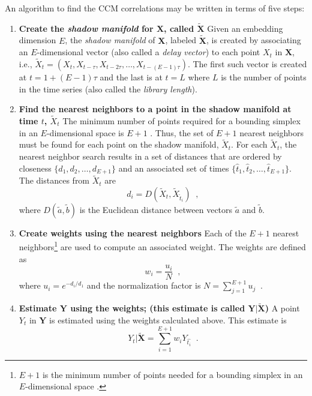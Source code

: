\documentclass{article}[10pt]
\begin{document}
An algorithm to find the CCM correlations may be written in terms of five steps:
\begin{enumerate}
\item {\bf Create the {\em shadow manifold} for $\mathbf{X}$, called $\tilde{\mathbf{X}}$}
Given an embedding dimension $E$, the {\em shadow manifold} of $\mathbf{X}$, labeled  $\tilde{\mathbf{X}}$, is created by associating an $E$-dimensional vector (also called a {\em delay vector}) to each point $X_t$ in $\mathbf{X}$, i.e., $\tilde{X}_t=\left(X_t,X_{t-\tau},X_{t-2\tau},\ldots,X_{t-(E-1)\tau}\right)$.  The first such vector is created at $t=1+(E-1)\tau$ and the last is at $t=L$ where $L$ is the number of points in the time series (also called the {\em library length}).

\item {\bf Find the nearest neighbors to a point in the shadow manifold at time $t$, $\tilde{X}_t$}
The minimum number of points required for a bounding simplex in an $E$-dimensional space is $E+1$ \cite{Sugihara1990,Sugihara1990a}.  Thus,  the set of $E+1$ nearest neighbors must be found for each point on the shadow manifold, $\tilde{X}_t$.  For each $\tilde{X}_t$, the nearest neighbor search results in a set of distances that are ordered by closeness $\{d_1,d_2,\ldots,d_{E+1}\}$ and an associated set of times $\{\hat{t}_1,\hat{t}_2,\ldots,\hat{t}_{E+1}\}$.  The distances from $\tilde{X}_t$ are
\begin{equation}
d_i = D\left(\tilde{X}_t,\tilde{X}_{\hat{t}_i}\right)\;\;,
\end{equation}
where $D(\tilde{a},\tilde{b})$ is the Euclidean distance between vectors $\tilde{a}$ and $\tilde{b}$.

\item {\bf Create weights using the nearest neighbors}
Each of the $E+1$ nearest neighbors\footnote{$E+1$ is the minimum number of points needed for a bounding simplex in an $E$-dimensional space \cite{Sugihara1990}.} are used to compute an associated weight.  The weights are defined as
\begin{equation}
\label{eqn:CCMweights}
w_i = \frac{u_i}{N}\;\;,
\end{equation}
where
$u_i = e^{-d_i/d_1}$ and the normalization factor is $N = \sum_{j=1}^{E+1} u_j\;\;.$

\item {\bf Estimate $\mathbf{Y}$ using the weights; (this estimate is called $\mathbf{Y}|\tilde{\mathbf{X}}$)}
A point $Y_t$ in $\mathbf{Y}$ is estimated using the weights calculated above.  This estimate is
\begin{equation}
Y_t|\tilde{\mathbf{X}} = \sum_{i=1}^{E+1} w_i Y_{\hat{t_i}}\;\;.
\end{equation}


\end{enumerate}
\end{document}
